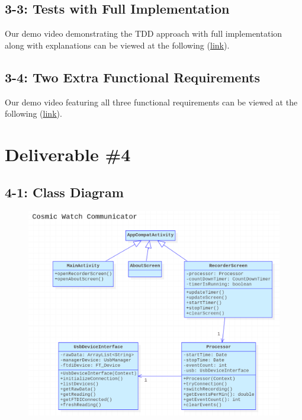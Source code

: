 \documentclass[11pt,a4paper]{article}
\begin{document}
\subsection*{3-3: Tests with Full Implementation}

Our demo video demonstrating the TDD approach with full implementation along with explanations can be viewed at the following (\href{https://www.youtube.com/watch?v=h2C-4-hQrhM&feature=youtu.be}{\underline{link}}).

\subsection*{3-4: Two Extra Functional Requirements}

Our demo video featuring all three functional requirements can be viewed at the following (\href{https://www.dropbox.com/s/vnuvuzx5zrtkvaa/Demo.mp4?dl=0}{\underline{link}}).



\newpage


\section*{Deliverable \#4}

\subsection*{4-1: Class Diagram}

\begin{figure}[h] \centering \hspace*{-3cm} \vspace{3cm}
	\includegraphics[width=1.5\textwidth]{classes.png}
\end{figure}
\newpage
\end{document}
